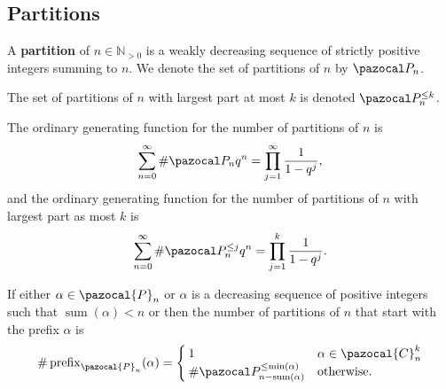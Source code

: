 \subsection{Partitions}
\begin{definition}
  A \textbf{partition} of $n \in \mathbb{N}_{>0}$ is a weakly decreasing
  sequence of strictly positive integers summing to $n$. We denote the set of
  partitions of $n$ by $\pazocal P_n$.

  The set of partitions of $n$ with largest part at most
  $k$ is denoted $\pazocal P_n^{\leq k}$.
\end{definition}

\begin{lemma}
  The ordinary generating function for the number of partitions of $n$ is \begin{equation}
    \sum_{n=0}^\infty \#\pazocal P_n q^n = \prod_{j=1}^\infty \frac{1}{1-q^j},
  \end{equation}
  and the ordinary generating function for the number of partitions of $n$ with largest part
  as most $k$ is \begin{equation}
    \sum_{n=0}^\infty \#\pazocal P_n^{\leq j} q^n = \prod_{j=1}^k \frac{1}{1-q^j}.
  \end{equation}
\end{lemma}

\begin{proposition}
  If either $\alpha \in \pazocal{P}_n$ or $\alpha$ is
  a decreasing sequence of positive integers such that
  ${\operatorname{sum}(\alpha) < n}$ or
  then the number of partitions of $n$ that start with the prefix $\alpha$
  is \begin{equation}
    \#\operatorname{prefix}_{\pazocal{P}_n}(\alpha) = \begin{cases}
      1 & \alpha \in \pazocal{C}_n^{k} \\
      \#\pazocal P_{n-\operatorname{sum}(\alpha)}^{\leq \operatorname{min}(\alpha)} & \text{otherwise}.
    \end{cases}
  \end{equation}
\end{proposition}

